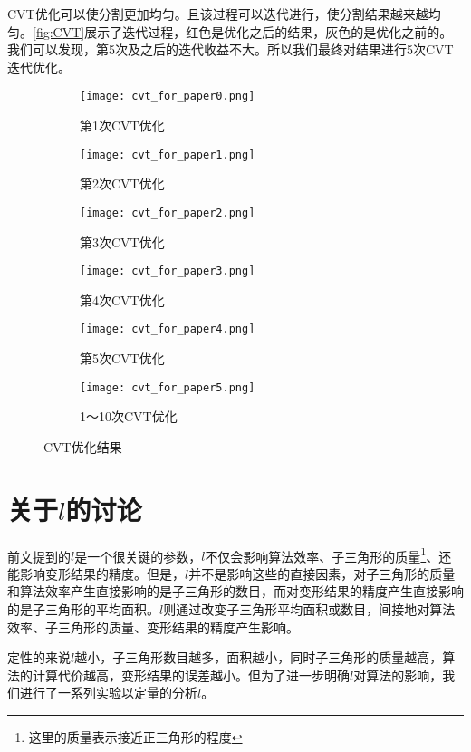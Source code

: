 CVT\cite{du1999}优化可以使分割更加均匀。且该过程可以迭代进行，使分割结果越来越均匀。\autoref{fig:CVT}展示了迭代过程，红色是优化之后的结果，灰色的是优化之前的。我们可以发现，第5次及之后的迭代收益不大。所以我们最终对结果进行5次CVT迭代优化。

\begin{figure}[htbp]
	\centering
	\begin{subfigure}[b]{.49\textwidth}
		\centering
		\texttt{[image: cvt\_for\_paper0.png]}
		\caption{第1次CVT优化}
	\end{subfigure}
	\begin{subfigure}[b]{.49\textwidth}
		\centering
		\texttt{[image: cvt\_for\_paper1.png]}
		\caption{第2次CVT优化}
	\end{subfigure}

	\begin{subfigure}[b]{.49\textwidth}
		\centering
		\texttt{[image: cvt\_for\_paper2.png]}
		\caption{第3次CVT优化}
	\end{subfigure}
	\begin{subfigure}[b]{.49\textwidth}
		\centering
		\texttt{[image: cvt\_for\_paper3.png]}
		\caption{第4次CVT优化}
	\end{subfigure}

	\begin{subfigure}[b]{.49\textwidth}
		\centering
		\texttt{[image: cvt\_for\_paper4.png]}
		\caption{第5次CVT优化}
	\end{subfigure}
	\begin{subfigure}[b]{.49\textwidth}
		\centering
		\texttt{[image: cvt\_for\_paper5.png]}
		\caption{1～10次CVT优化}
	\end{subfigure}
    \caption{CVT优化结果} \label{fig:CVT}
\end{figure}

\section{关于$l$的讨论}
前文提到的$l$是一个很关键的参数，$l$不仅会影响算法效率、子三角形的质量\footnote{这里的质量表示接近正三角形的程度}、还能影响变形结果的精度。但是，$l$并不是影响这些的直接因素，对子三角形的质量和算法效率产生直接影响的是子三角形的数目，而对变形结果的精度产生直接影响的是子三角形的平均面积。$l$则通过改变子三角形平均面积或数目，间接地对算法效率、子三角形的质量、变形结果的精度产生影响。

定性的来说$l$越小，子三角形数目越多，面积越小，同时子三角形的质量越高，算法的计算代价越高，变形结果的误差越小。但为了进一步明确$l$对算法的影响，我们进行了一系列实验以定量的分析$l$。


